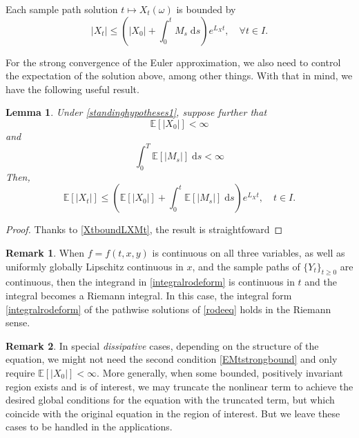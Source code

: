 \documentclass[reqno,12pt]{amsart}
\theoremstyle{plain}%
\newtheorem{lem}{Lemma}[section]
\theoremstyle{definition}
\newtheorem{rmk}{Remark}[section]
\begin{document}
Each sample path solution $t \mapsto X_t(\omega)$ is bounded by
\begin{equation}
    \label{XtboundLXMt}
    |X_t| \leq \left(|X_0| + \int_0^t M_s\;\mathrm{d}s\right) e^{L_X t}, \quad \forall t\in I.
\end{equation}

For the strong convergence of the Euler approximation, we also need to control the expectation of the solution above, among other things. With that in mind, we have the following useful result.

\begin{lem}
    Under \cref{standinghypotheses1}, suppose further that
    \begin{equation}
        \label{EX0strongbound}
        \mathbb{E}[|X_0|] < \infty
    \end{equation}
    and
    \begin{equation}
        \label{EMtstrongbound}
        \int_0^T \mathbb{E}[|M_s|] \;\mathrm{d}s < \infty
    \end{equation}
    Then,
    \begin{equation}
        \label{EXtstrongbound}
        \mathbb{E}[|X_t|] \leq \left(\mathbb{E}[|X_0|] + \int_0^t \mathbb{E}[|M_s|]\;\mathrm{d}s\right) e^{L_X t}, \quad t\in I.
    \end{equation}
\end{lem}

\begin{proof}
    Thanks to \eqref{XtboundLXMt}, the result is straightfoward
\end{proof}

\begin{rmk}
    When $f=f(t, x, y)$ is continuous on all three variables, as well as uniformly globally Lipschitz continuous in $x$, and the sample paths of $\{Y_t\}_{t\geq 0}$ are continuous, then the integrand in \eqref{integralrodeform} is continuous in $t$ and the integral becomes a Riemann integral. In this case, the integral form \eqref{integralrodeform} of the pathwise solutions of \eqref{rodeeq} holds in the Riemann sense.
\end{rmk}

\begin{rmk}
    In special \emph{dissipative} cases, depending on the structure of the equation, we might not need the second condition \eqref{EMtstrongbound} and only require $\mathbb{E}[|X_0|] < \infty$. More generally, when some bounded, positively invariant region exists and is of interest, we may truncate the nonlinear term to achieve the desired global conditions for the equation with the truncated term, but which coincide with the original equation in the region of interest. But we leave these cases to be handled in the applications.
\end{rmk}
\end{document}
